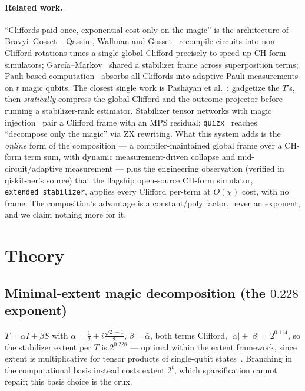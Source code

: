 \documentclass[11pt]{article}
\begin{document}
\paragraph{Related work.}
``Cliffords paid once, exponential cost only on the magic'' is the
architecture of Bravyi--Gosset~\cite{bravyi2016}; Qassim, Wallman and
Gosset~\cite{qassim2019} recompile circuits into non-Clifford rotations times
a single global Clifford precisely to speed up CH-form simulators;
Garc\'ia--Markov~\cite{garcia2015} shared a stabilizer frame across
superposition terms; Pauli-based computation~\cite{peres2023} absorbs all
Cliffords into adaptive Pauli measurements on $t$ magic qubits. The closest
single work is Pashayan et al.~\cite{pashayan2022}: gadgetize the $T$'s, then
\emph{statically} compress the global Clifford and the outcome projector
before running a stabilizer-rank estimator. Stabilizer tensor networks with
magic injection~\cite{nakhl2025} pair a Clifford frame with an MPS residual;
\texttt{quizx}~\cite{kissinger2022} reaches ``decompose only the magic'' via
ZX rewriting. What this system adds is the \emph{online} form of the
composition --- a compiler-maintained global frame over a CH-form term sum,
with dynamic measurement-driven collapse and mid-circuit/adaptive measurement
--- plus the engineering observation (verified in qiskit-aer's source) that
the flagship open-source CH-form simulator, \texttt{extended\_stabilizer},
applies every Clifford per-term at $O(\chi)$ cost, with no frame. The
composition's advantage is a constant/poly factor, never an exponent, and we
claim nothing more for it.

\section{Theory}\label{sec:theory}

\subsection{Minimal-extent magic decomposition (the $0.228$ exponent)}
$T = \alpha I + \beta S$ with
$\alpha=\tfrac12+i\tfrac{\sqrt2-1}{2}$, $\beta=\bar\alpha$, both terms
Clifford, $|\alpha|+|\beta| = 2^{0.114}$, so the stabilizer extent per $T$ is
$2^{0.228}$ --- optimal within the extent framework, since extent is
multiplicative for tensor products of single-qubit states~\cite{bravyi2019}.
Branching in the computational basis instead costs extent $2^t$, which
sparsification cannot repair; this basis choice is the crux.
\end{document}
